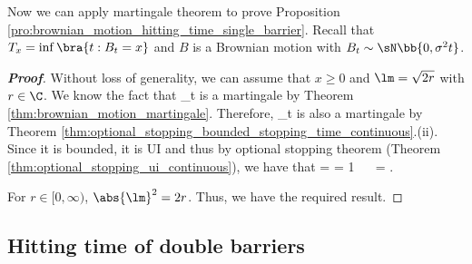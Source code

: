 Now we can apply martingale theorem to prove Proposition \ref{pro:brownian_motion_hitting_time_single_barrier}. Recall that $T_x = \inf\bra{t:B_t = x}$ and $B$ is a Brownian motion with $B_t \sim \sN\bb{0,\sigma^2 t}$.

\begin{proof}[\bf Proof]%

Without loss of generality, we can assume that $x\geq 0$ and $\lm = \sqrt{2r}$ with $r\in \C$. We know the fact that
\be
{}_{t}
\ee
is a martingale by Theorem \ref{thm:brownian_motion_martingale}. Therefore,
\be
{}_{t}
\ee
is also a martingale by Theorem \ref{thm:optional_stopping_bounded_stopping_time_continuous}.(ii). Since it is bounded, it is UI and thus by optional stopping theorem (Theorem \ref{thm:optional_stopping_ui_continuous}), we have that
\be
\E{} = \E{} = 1  \ \ra \ \exp{} = \E{}.
\ee

For $r\in [0,\infty)$, $\abs{\lm}^2 = 2r$. Thus, we have the required result.%
\end{proof}

\subsection{Hitting time of double barriers}

